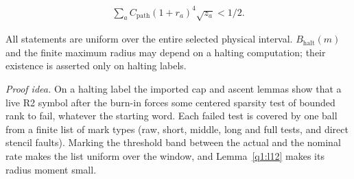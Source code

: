 \begin{lemma}
\[
\begin{gathered}
\sum _{a} C_{\mathrm{path}} (1+r_{a})^{4} \sqrt{z_{a}} < 1/2.
\end{gathered}
\]

All statements are uniform over the entire selected physical interval. \(B_{\mathrm{halt}}(m)\) and the finite maximum radius may depend on a halting computation; their existence is asserted only on halting labels.

\end{lemma}
\par\noindent\emph{Proof idea.} On a halting label the imported cap and ascent lemmas show that a live R2 symbol after the burn-in forces some centered sparsity test of bounded rank to fail, whatever the starting word. Each failed test is covered by one ball from a finite list of mark types (raw, short, middle, long and full tests, and direct stencil faults). Marking the threshold band between the actual and the nominal rate makes the list uniform over the window, and Lemma~\ref{q1:l12} makes its radius moment small.

